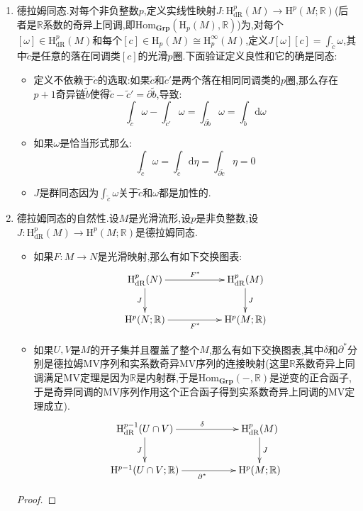 \begin{enumerate}
\begin{proof}
		考虑面映射$F_{i,p}:\Delta_{p-1}\to\Delta_p$,即把$[e_0,e_1,\cdots,e_p]$映射为$[e_0,\cdots,\hat{e_i},\cdots,e_p,e_i]$,这是保定向的当且仅当$(e_0,\cdots,\hat{e_i},\cdots,e_p,e_i)$是$(e_0,\cdots,e_p)$的偶置换,当且仅当$p-i$是偶数,于是当$i$是偶数时$F_{i,p}$是保定向的,当$i$是奇数时$F_{i,p}$是反定向的.于是按照引理得到:
		$$\int_{\partial\Delta_p}=\sigma^*\omega=\sum_{i=0}^p(-1)^i\int_{\Delta_{p-1}}F_{i,p}^*\sigma^*\omega=\sum_{i=0}^p(-1)^i\int_{\Delta_{p-1}}(\sigma\circ F_{i,p})^*\omega=\sum_{i=0}^p(-1)^i\int_{\sigma\circ F_{i,p}}\omega=\int_{\partial\sigma}\omega$$
	\end{proof}
    \item 德拉姆同态.对每个非负整数$p$,定义实线性映射$J:\mathrm{H}^p_{\mathrm{dR}}(M)\to\mathrm{H}^p(M;\mathbb{R})$(后者是$\mathbb{R}$系数的奇异上同调,即$\mathrm{Hom}_{\textbf{Grp}}(\mathrm{H}_p(M),\mathbb{R})$)为,对每个$[\omega]\in\mathrm{H}^p_{\mathrm{dR}}(M)$和每个$[c]\in\mathrm{H}_p(M)\cong\mathrm{H}_p^{\infty}(M)$,定义$J[\omega][c]=\int_{\widetilde{c}}\omega$,其中$\widetilde{c}$是任意的落在同调类$[c]$的光滑$p$圈.下面验证定义良性和它的确是同态:
    \begin{itemize}
    	\item 定义不依赖于$\widetilde{c}$的选取:如果$\widetilde{c}$和$\widetilde{c}'$是两个落在相同同调类的$p$圈,那么存在$p+1$奇异链$\widetilde{b}$使得$\widetilde{c}-\widetilde{c}'=\partial\widetilde{b}$,导致:
    	$$\int_{\widetilde{c}}\omega-\int_{\widetilde{c}'}\omega=\int_{\partial\widetilde{b}}\omega=\int_{\widetilde{b}}\mathrm{d}\omega$$
    	\item 如果$\omega$是恰当形式那么:$$\int_{\widetilde{c}}\omega=\int_{\widetilde{c}}\mathrm{d}\eta=\int_{\partial\widetilde{c}}\eta=0$$
    	\item $J$是群同态因为$\int_{\widetilde{c}}\omega$关于$\widetilde{c}$和$\omega$都是加性的.
    \end{itemize}
    \item 德拉姆同态的自然性.设$M$是光滑流形,设$p$是非负整数,设$J:\mathrm{H}^p_{\mathrm{dR}}(M)\to\mathrm{H}^p(M;\mathbb{R})$是德拉姆同态.
    \begin{itemize}
    	\item 如果$F:M\to N$是光滑映射,那么有如下交换图表:
    	$$\xymatrix{\mathrm{H}_{\mathrm{dR}}^p(N)\ar[rr]^{F^*}\ar[d]_J&&\mathrm{H}_{\mathrm{dR}}^p(M)\ar[d]^J\\\mathrm{H}^p(N;\mathbb{R})\ar[rr]_{F^*}&&\mathrm{H}^p(M;\mathbb{R})}$$
    	\item 如果$U,V$是$M$的开子集并且覆盖了整个$M$,那么有如下交换图表,其中$\delta$和$\partial^*$分别是德拉姆MV序列和实系数奇异MV序列的连接映射(这里$\mathbb{R}$系数奇异上同调满足MV定理是因为$\mathbb{R}$是内射群,于是$\mathrm{Hom}_{\textbf{Grp}}(-,\mathbb{R})$是逆变的正合函子,于是奇异同调的MV序列作用这个正合函子得到实系数奇异上同调的MV定理成立).
    	$$\xymatrix{\mathrm{H}_{\mathrm{dR}}^{p-1}(U\cap V)\ar[rr]^{\delta}\ar[d]_J&&\mathrm{H}_{\mathrm{dR}}^p(M)\ar[d]^J\\\mathrm{H}^{p-1}(U\cap V;\mathbb{R})\ar[rr]_{\partial^*}&&\mathrm{H}^p(M;\mathbb{R})}$$
    \end{itemize}
    \begin{proof}
    	

\end{proof}
\end{enumerate}
